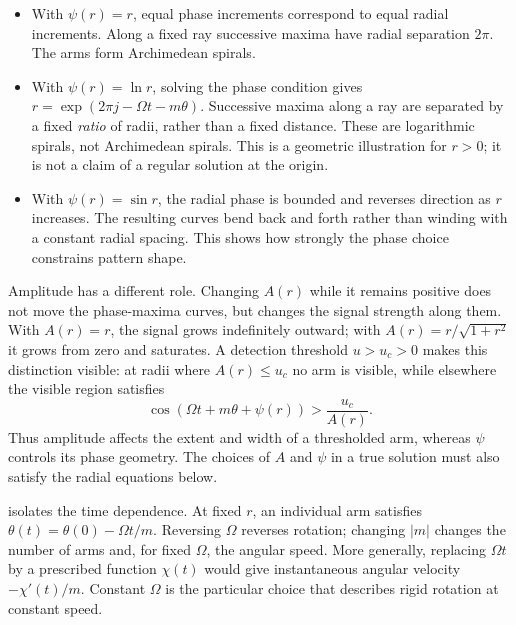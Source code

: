 \documentclass[main.tex]{subfiles}
\begin{document}
\begin{itemize}
\item With $\psi(r)=r$, equal phase increments correspond to equal radial increments. Along a fixed ray successive maxima have radial separation $2\pi$. The arms form Archimedean spirals.
\item With $\psi(r)=\ln r$, solving the phase condition gives $r=\exp(2\pi j-\Omega t-m\theta)$. Successive maxima along a ray are separated by a fixed \emph{ratio} of radii, rather than a fixed distance. These are logarithmic spirals, not Archimedean spirals. This is a geometric illustration for $r>0$; it is not a claim of a regular solution at the origin.
\item With $\psi(r)=\sin r$, the radial phase is bounded and reverses direction as $r$ increases. The resulting curves bend back and forth rather than winding with a constant radial spacing. This shows how strongly the phase choice constrains pattern shape.
\end{itemize}

Amplitude has a different role. Changing $A(r)$ while it remains positive does not move the phase-maxima curves, but changes the signal strength along them. With $A(r)=r$, the signal grows indefinitely outward; with $A(r)=r/\sqrt{1+r^2}$ it grows from zero and saturates. A detection threshold $u>u_c>0$ makes this distinction visible: at radii where $A(r)\leq u_c$ no arm is visible, while elsewhere the visible region satisfies
\[
\cos(\Omega t+m\theta+\psi(r))>\frac{u_c}{A(r)}.
\]
Thus amplitude affects the extent and width of a thresholded arm, whereas $\psi$ controls its phase geometry. The choices of $A$ and $\psi$ in a true solution must also satisfy the radial equations below.


 isolates the time dependence. At fixed $r$, an individual arm satisfies $\theta(t)=\theta(0)-\Omega t/m$. Reversing $\Omega$ reverses rotation; changing $|m|$ changes the number of arms and, for fixed $\Omega$, the angular speed. More generally, replacing $\Omega t$ by a prescribed function $\chi(t)$ would give instantaneous angular velocity $-\chi'(t)/m$. Constant $\Omega$ is the particular choice that describes rigid rotation at constant speed.
\end{document}
